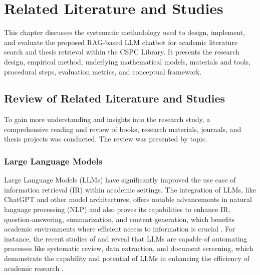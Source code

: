 \chapter{Related Literature and Studies}
\begin{refsection}

This chapter discusses the systematic methodology used to design, implement, and evaluate the proposed RAG-based LLM chatbot for academic literature search and thesis retrieval within the CSPC Library. It presents the research design, empirical method, underlying mathematical models, materials and tools, procedural steps, evaluation metrics, and conceptual framework.

\section{Review of Related Literature and Studies}
To gain more understanding and insights into the research study, a comprehensive reading and review of books, research materials, journals, and thesis projects was conducted. The review was presented by topic.

\subsection{Large Language Models}

\hspace{1cm}Large Language Models (LLMs) have significantly improved the use case of information retrieval (IR) within academic settings. The integration of LLMs, like ChatGPT and other model architectures, offers notable advancements in natural language processing (NLP) and also proves its capabilities to enhance IR, question-answering, summarization, and content generation, which benefits academic environments where efficient access to information is crucial \cite{yalamanchili2024quality} \cite{yang2023large}. For instance, the recent studies of \citeauthor{khraisha2024can} \citeyear{khraisha2024can} and \citeauthor{gartlehner2023data} \citeyear{gartlehner2023data} reveal that LLMs are capable of automating processes like systematic review, data extraction, and document screening, which demonstrate the capability and potential of LLMs in enhancing the efficiency of academic research \cite{khraisha2024can}  \cite{gartlehner2023data}.


\end{refsection}
